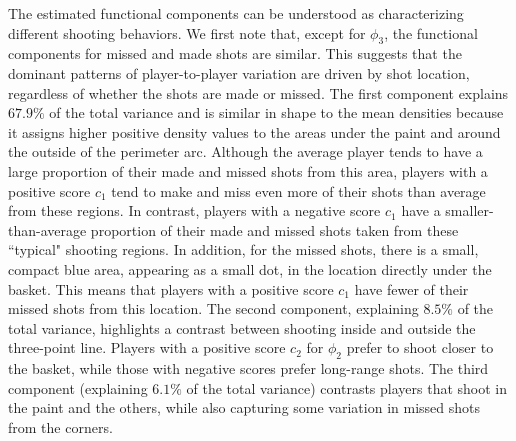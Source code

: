 \documentclass[USenglish]{article}
\theoremstyle{dgthm}
\theoremstyle{dgdef}
\begin{document}
The estimated functional components can be understood as characterizing different shooting behaviors. We first note that, except for $\phi_3$, the functional components for missed and made shots are similar.
	This suggests that the dominant patterns of player-to-player variation are driven by shot location, regardless of whether the shots are made or missed.
	The first component explains $67.9\%$ of the total variance and is similar in shape to the mean densities because it assigns higher positive density values to the areas under the paint and around the outside of the perimeter arc.
		Although the average player tends to have a large proportion of their made and missed shots from this area, players with a positive score $c_1$ tend to make and miss even more of their shots than average from these regions.
        In contrast, players with a negative score $c_1$ have a smaller-than-average proportion of their made and missed shots taken from these ``typical" shooting regions.
		In addition, for the missed shots, there is a small, compact blue area, appearing as a small dot, in the location directly under the basket.
		This means that players with a positive score $c_1$ have fewer of their missed shots from this location.
The second component, explaining $8.5\%$ of the total variance, highlights a contrast between shooting inside and outside the three-point line.
Players with a positive score $c_2$ for $\phi_2$ prefer to shoot closer to the basket, while those with negative scores prefer long-range shots.
	The third component (explaining $6.1\%$ of the total variance) contrasts players that shoot in the paint and the others, while also capturing some variation in missed shots from the corners.
\end{document}
